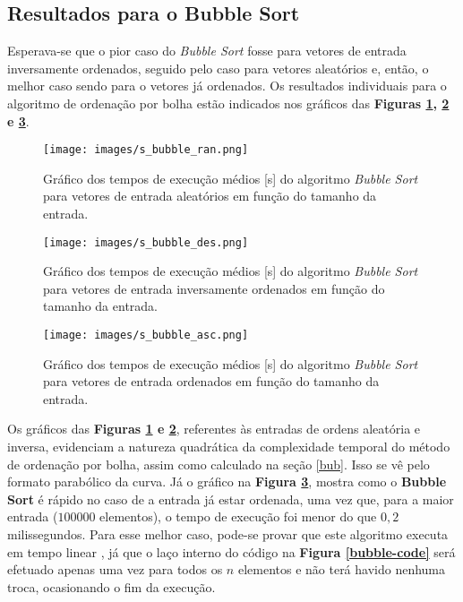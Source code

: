 \documentclass[fontsize=10pt]{article}
\begin{document}
\subsection{Resultados para o Bubble Sort}

Esperava-se que o pior caso do \textit{Bubble Sort} fosse para vetores de entrada inversamente ordenados, seguido pelo caso para vetores aleatórios e, então, o melhor caso sendo para o vetores já ordenados. Os resultados individuais para o algoritmo de ordenação por bolha estão indicados nos gráficos das \textbf{Figuras \ref{s-bub-ran}, \ref{s-bub-des} e \ref{s-bub-asc}}.

\begin{figure}[H]
\centering
\texttt{[image: images/s\_bubble\_ran.png]}
\caption{Gráfico dos tempos de execução médios [s] do algoritmo \textit{Bubble Sort} para vetores de entrada aleatórios em função do tamanho da entrada.}
\label{s-bub-ran}
\end{figure}

\begin{figure}[H]
\centering
\texttt{[image: images/s\_bubble\_des.png]}
\caption{Gráfico dos tempos de execução médios [s] do algoritmo \textit{Bubble Sort} para vetores de entrada inversamente ordenados em função do tamanho da entrada.}
\label{s-bub-des}
\end{figure}

\begin{figure}[H]
\centering
\texttt{[image: images/s\_bubble\_asc.png]}
\caption{Gráfico dos tempos de execução médios [s] do algoritmo \textit{Bubble Sort} para vetores de entrada ordenados em função do tamanho da entrada.}
\label{s-bub-asc}
\end{figure}

Os gráficos das \textbf{Figuras \ref{s-bub-ran} e \ref{s-bub-des}}, referentes às entradas de ordens aleatória e inversa, evidenciam a natureza quadrática da complexidade temporal do método de ordenação por bolha, assim como calculado na seção \ref{bub}. Isso se vê pelo formato parabólico da curva. Já o gráfico na \textbf{Figura \ref{s-bub-asc}}, mostra como o \textbf{Bubble Sort} é rápido no caso de a entrada já estar ordenada, uma vez que, para a maior entrada ($100000$ elementos), o tempo de execução foi menor do que $0,2$ milissegundos. Para esse melhor caso, pode-se provar que este algoritmo executa em tempo linear \cite{cormen}, já que o laço interno do código na \textbf{Figura \ref{bubble-code}} será efetuado apenas uma vez para todos os $n$ elementos e não terá havido nenhuma troca, ocasionando o fim da execução.
\end{document}
